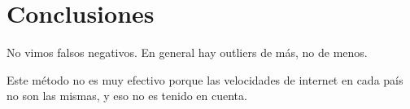 \section{Conclusiones}

No vimos falsos negativos. En general hay outliers de más, no de menos. 

Este método no es muy efectivo porque las velocidades de internet en cada país no son las mismas, y eso no es tenido en cuenta.